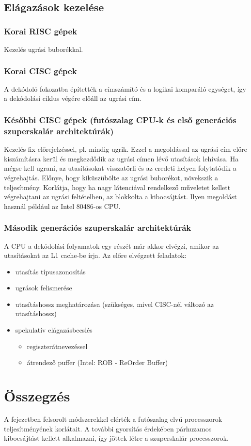 \subsection{Elágazások kezelése}
\subsubsection{Korai RISC gépek}
Kezelés ugrási buborékkal.
\subsubsection{Korai CISC gépek}
A dekódoló fokozatba építették a címszámító és a logikai komparáló egységet, így a dekódolási ciklus végére előáll az ugrási cím.
\subsubsection{Későbbi CISC gépek (futószalag CPU-k és első generációs szuperskalár architektúrák)}
Kezelés fix előrejelzéssel, pl. mindig ugrik.
Ezzel a megoldással az ugrási cím előre kiszámításra kerül és megkezdődik az ugrási címen lévő utasítások lehívása.
Ha mégse kell ugrani, az utasításokat visszatörli és az eredeti helyen folytatódik a végrehajtás.
Előnye, hogy kiküszübölte az ugrási buborékot, növekszik a teljesítmény.
Korlátja, hogy ha nagy látenciával rendelkező műveletet kellett végrehajtani az ugrási feltételben, az blokkolta a kibocsájtást.
Ilyen megoldást használ például az Intel 80486-os CPU.
\subsubsection{Második generációs szuperskalár architektúrák}
A CPU a dekódolási folyamatok egy részét már akkor elvégzi, amikor az utasításokat az L1 cache-be írja.
Az előre elvégzett feladatok:
\begin{itemize}
    \item utasítás típusazonosítás
    \item ugrások felismerése
    \item utasításhossz meghatározása (szükséges, mivel CISC-nél változó az utasításhossz)
    \item spekulatív elágazásbecslés
    \begin{itemize}
        \item regiszterátnevezéssel
        \item átrendező puffer (Intel: ROB - ReOrder Buffer)
    \end{itemize}
\end{itemize}

\section{Összegzés}
A fejezetben felsorolt módszerekkel elérték a futószalag elvű processzorok teljesítményének korlátait.
A további gyorsítás érdekében párhuzamos kibocsájtást kellett alkalmazni, így jöttek létre a szuperskalár processzorok.